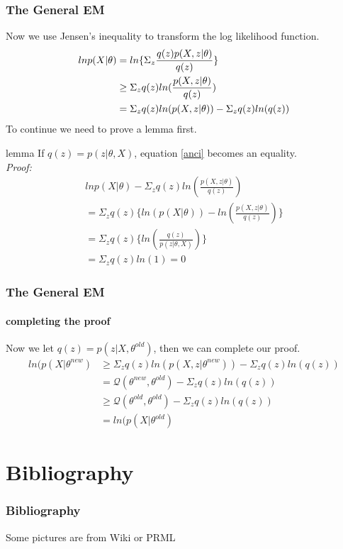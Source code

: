 \documentclass{beamer}
\begin{document}
\begin{frame}
\frametitle{The General EM}
Now we use Jensen's inequality to transform the log likelihood function.
\begin{equation}{\label{anci}}
\begin{split}
lnp(X|\theta) &= ln\{\Sigma_z\frac{q(z)p(X,z|\theta)}{q(z)}\}\\
&\geq \Sigma_zq(z)ln(\frac{p(X,z|\theta)}{q(z)})\\
&=\Sigma_zq(z)ln(p(X,z|\theta))-\Sigma_zq(z)ln(q(z))
\end{split}
\end{equation}
To continue we need to prove a lemma first.
\end{frame}
\begin{frame}
\begin{block}{lemma}
If $q(z)=p(z|\theta,X)$, equation \ref{anci} becomes an equality.\\
\emph{Proof:}
\begin{equation}
\begin{split}
lnp(X|\theta)- \Sigma_zq(z)ln(\frac{p(X,z|\theta)}{q(z)})\\
=\Sigma_zq(z)\{ln(p(X|\theta))-ln(\frac{p(X,z|\theta)}{q(z)})\}\\
=\Sigma_zq(z)\{ln(\frac{q(z)}{p(z|\theta,X)})\}\\
=\Sigma_zq(z)ln(1)=0
\end{split}
\end{equation}
\end{block}
\end{frame}

\begin{frame}
\frametitle{The General EM}
\framesubtitle{completing the proof}
Now we let $q(z)=p(z|X,\theta^{old})$, then we can complete our proof.
\begin{equation}
\begin{split}
ln(p(X|\theta^{new}) &\geq \Sigma_zq(z)ln(p(X,z|\theta^{new}))-\Sigma_zq(z)ln(q(z))\\
&=\mathcal{Q}(\theta^{new}, \theta^{old})- \Sigma_zq(z)ln(q(z))\\
&\geq \mathcal{Q}(\theta^{old}, \theta^{old})- \Sigma_zq(z)ln(q(z))\\
&= ln(p(X|\theta^{old})
\end{split}
\end{equation}
\end{frame}
\section*{Bibliography}
\begin{frame}%
\frametitle{Bibliography}

\begin{thebibliography}{Tantau, 2007}
Some pictures are from Wiki or PRML

\end{thebibliography}
\end{frame}
\end{document}
